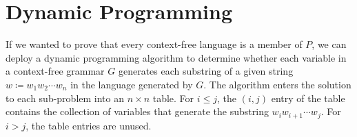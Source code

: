 








\section{Dynamic Programming}

If we wanted to prove that every context-free language is a member of $P$, we can deploy a dynamic programming algorithm to determine whether each variable in a context-free grammar $G$ generates each substring of a given string $w \coloneq w_1 w_2 \cdots w_n$ in the language generated by $G$. The algorithm enters the solution to each sub-problem into an $n \times n$ table. For $i \leq j$, the $(i,j)$ entry of the table contains the collection of variables that generate the substring $w_i w_{i+1} \cdots w_j$. For $i > j$, the table entries are unused.
